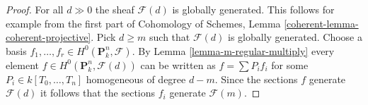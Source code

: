 \documentclass[10pt,a4paper]{amsart}
\theoremstyle{plain}
\theoremstyle{definition}
\theoremstyle{remark}
\numberwithin{equation}{subsection}
\begin{document}
\begin{proof}
For all $d \gg 0$ the sheaf $\mathcal{F}(d)$ is globally generated.
This follows for example from the first part of
Cohomology of Schemes, Lemma \ref{coherent-lemma-coherent-projective}.
Pick $d \geq m$ such that $\mathcal{F}(d)$ is globally generated.
Choose a basis $f_1, \ldots, f_r \in H^0(\mathbf{P}^n_k, \mathcal{F})$.
By Lemma \ref{lemma-m-regular-multiply} every element
$f \in H^0(\mathbf{P}^n_k, \mathcal{F}(d))$ can be written as
$f = \sum P_if_i$ for some $P_i \in k[T_0, \ldots, T_n]$ homogeneous
of degree $d - m$. Since the sections $f$ generate $\mathcal{F}(d)$
it follows that the sections $f_i$ generate $\mathcal{F}(m)$.
\end{proof}
\end{document}
